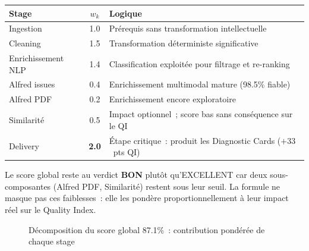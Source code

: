 \begin{longtable}{lcp{8.5cm}}
\toprule
\textbf{Stage} & $w_k$ & \textbf{Logique} \\
\midrule
Ingestion & 1.0 & Prérequis sans transformation intellectuelle \\
Cleaning & 1.5 & Transformation déterministe significative \\
Enrichissement NLP & 1.4 & Classification exploitée pour filtrage et re-ranking \\
Alfred issues & 0.4 & Enrichissement multimodal mature (98.5\% fiable) \\
Alfred PDF & 0.2 & Enrichissement encore exploratoire \\
Similarité & 0.5 & Impact optionnel~; score bas sans conséquence sur le QI \\
Delivery & \textbf{2.0} & Étape critique~: produit les Diagnostic Cards ($+33$~pts QI) \\
\bottomrule
\end{longtable}

Le score global reste au verdict \textbf{BON} plutôt qu'EXCELLENT car deux sous-composantes (Alfred PDF, Similarité) restent sous leur seuil. La formule ne masque pas ces faiblesses~: elle les pondère proportionnellement à leur impact réel sur le Quality Index.

\begin{figure}[H]
\centering
{}
\caption{Décomposition du score global 87.1\%~: contribution pondérée de chaque stage}
\label{fig:score_decomposition}
\end{figure}

